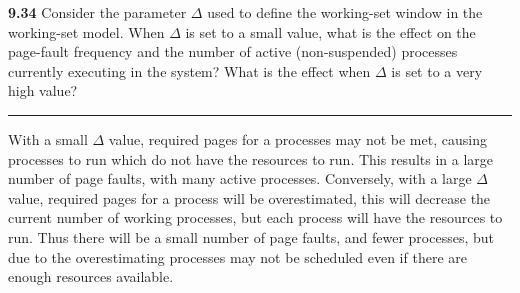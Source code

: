 \documentclass[12pt]{jhwhw}
\begin{document}
\bigbreak
\textbf{9.34}  
	Consider the parameter $\Delta$ used to define the working-set window in the working-set model.
	When $\Delta$ is set to a small value, what is the effect on the page-fault frequency and the number
	of active (non-suspended) processes currently executing in the system? What is the effect when $\Delta$
	is set to a very high value?
\textcolor[RGB]{240,240,240}{\rule{\textwidth}{0.5pt}}\bigbreak

	\begin{addmargin}[1em]{}
		With a small $\Delta$ value, required pages for a processes may not be met, causing
		processes to run which do not have the resources to run. This results in a large
		number of page faults, with many active processes.
		\bigbreak
		Conversely, with a large $\Delta$ value, required pages for a process will be overestimated,
		this will decrease the current number of working processes, but each process
		will have the resources to run. Thus there will be a small number of 
		page faults, and fewer processes, but due to the overestimating processes may not be scheduled
		even if there are enough resources available.
	\end{addmargin}
\end{document}
